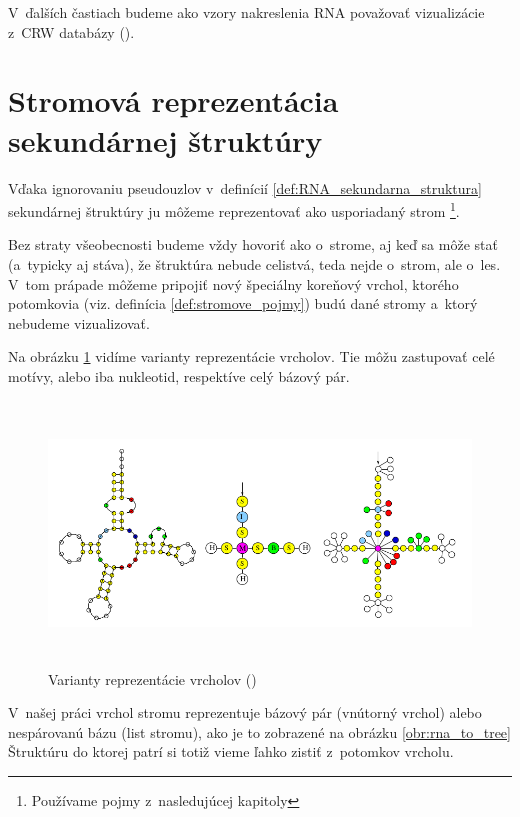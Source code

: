 V~ďalších častiach budeme ako vzory nakreslenia RNA považovať vizualizácie
z~CRW databázy (\citet{CRW}).




\section{Stromová reprezentácia sekundárnej štruktúry}

Vďaka ignorovaniu pseudouzlov v~definícií \ref{def:RNA_sekundarna_struktura} sekundárnej
štruktúry ju môžeme reprezentovať ako usporiadaný strom
\footnote{Používame pojmy z~nasledujúcej kapitoly }.

Bez straty všeobecnosti budeme vždy hovoriť ako o~strome, aj keď sa môže stať
(a~typicky aj stáva), že štruktúra nebude celistvá, teda nejde o~strom, ale o~les.
V~tom prápade môžeme pripojiť nový špeciálny koreňový vrchol, ktorého potomkovia
(viz. definícia \ref{def:stromove_pojmy}) budú dané stromy a~ktorý nebudeme vizualizovať.

Na obrázku \ref{obr:RNA_stromova_reprezentacia} vidíme varianty reprezentácie vrcholov.
Tie môžu zastupovať celé motívy, alebo iba nukleotid, respektíve celý bázový pár.

\begin{figure}
  \centering
  \includegraphics[width=130mm, height=70mm]{../img/stromova_reprezentacia_rna}
  \caption{Varianty reprezentácie vrcholov (\citet{RNA_DRAW})}
  \label{obr:RNA_stromova_reprezentacia}
\end{figure}

V~našej práci vrchol stromu reprezentuje bázový pár (vnútorný vrchol)
alebo nespárovanú bázu (list stromu), ako je to zobrazené na obrázku \ref{obr:rna_to_tree}
Štruktúru do ktorej patrí si totiž vieme ľahko zistiť z~potomkov vrcholu.






